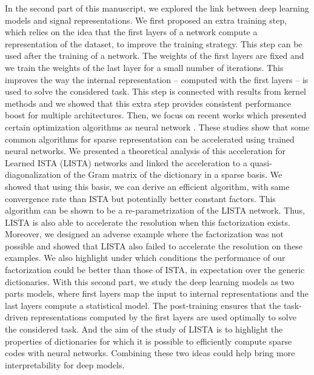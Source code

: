 \documentclass[../thesis.tex]{subfiles}
\begin{document}
	In the second part of this manuscript, we explored the link between deep learning models and
	signal representations. We first proposed an extra training step, which relies on the idea that
	the first layers of a network compute a representation of the dataset, to improve the training
	strategy. This step can be used after the training of a network. The weights of the first
	layers are fixed and we train the weights of the last layer for a small number of iterations.
	This improves the way the internal representation -- computed with the first layers -- is
	used to solve the considered task. This step is connected with results from kernel methods
	and we showed that this extra step provides consistent performance boost for
	multiple architectures. Then, we focus on recent works which presented certain optimization
	algorithms as neural network \citep{Gregor10}. These studies show that some
	common algorithms for sparse representation can be accelerated using trained neural
	networks. We presented a theoretical analysis of this acceleration for Learned ISTA (LISTA)
	networks and linked the acceleration to a quasi-diagonalization of the Gram matrix of the
	dictionary in a sparse basis. We showed that using this basis, we can derive an efficient
	algorithm, with same convergence rate than ISTA but potentially better constant factors.
	This algorithm can be shown to be a re-parametrization of the LISTA network. Thus, LISTA
	is also able to accelerate the resolution when this factorization exists. Moreover, we
	designed an adverse example where the factorization was not possible and showed that LISTA
	also failed to accelerate the resolution on these examples. We also highlight under
	which conditions the performance of our factorization could be better than those of ISTA,
	in expectation over the generic dictionaries. With this second part, we study the deep
	learning models as two parts models, where first layers map the input to internal
	representations and the last layers compute a statistical model. The post-training
	ensures that the task-driven representations computed by the first layers are used
	optimally to solve the considered task. And the aim of the study of LISTA is to highlight
	the properties of dictionaries for which it is possible to efficiently compute sparse
	codes with neural networks. Combining these two ideas could help bring more interpretability
	for deep models.
\end{document}
